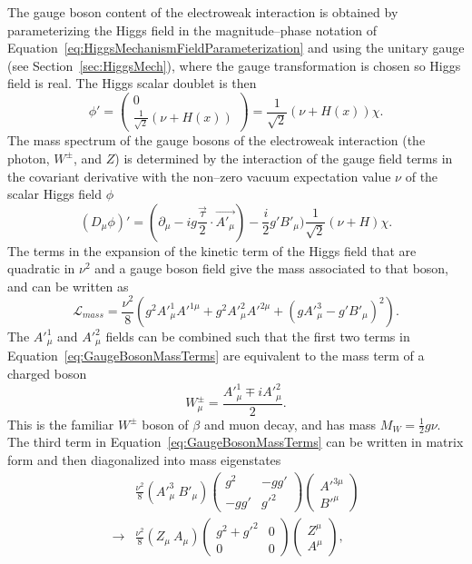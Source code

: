 The gauge boson content of the electroweak interaction is obtained by
parameterizing the Higgs field in the magnitude--phase notation of
Equation~\ref{eq:HiggsMechanismFieldParameterization} and using the unitary
gauge (see Section~\ref{sec:HiggsMech}), where the gauge transformation is
chosen so Higgs field is real.  The Higgs scalar doublet is then 
\begin{equation}
  \phi' =  \left(\begin{array}{c} 0 \\ \frac{1}{\sqrt 2}(\nu +
    H(x))\end{array}\right) = 
    \frac{1}{\sqrt 2}(\nu + H(x))\chi.
    \label{eq:HiggsFieldParameterization}
\end{equation}
The mass spectrum of the gauge bosons of the electroweak interaction (the
photon, $W^\pm$, and $Z$) is determined by the interaction of the gauge field
terms in the covariant derivative with the non--zero vacuum expectation value
$\nu$ of the scalar Higgs field $\phi$
\begin{equation}
  (D_\mu\phi)' = (\partial_\mu - i g \frac{\vec \tau}{2}\cdot \vec{A'_\mu}) -
  \frac{i}{2}g'B'_\mu)\frac{1}{\sqrt 2}(\nu + H)\chi.
  \nonumber
\end{equation}
The terms in the expansion of the kinetic term of the Higgs field that are
quadratic in $\nu^2$ and a gauge boson field give the mass associated to that
boson, and can be written as
\begin{equation}
  \mathcal{L}_{mass} = \frac{\nu^2}{8}(
  g^2 A'^1_\mu A'^{1\mu} + g^2 A'^2_\mu A'^{2\mu} + (g A'^3_\mu - g'B'_\mu)^2).
  \label{eq:GaugeBosonMassTerms}
\end{equation}
The $A'^1_\mu$ and $A'^2_\mu$ fields can be combined such that the first two
terms in Equation~\ref{eq:GaugeBosonMassTerms} are equivalent to the mass term
of a charged boson
\begin{equation}
  W^\pm_\mu = \frac{A'^{1}_\mu \mp iA'^2_\mu}{2}.
\end{equation}
This is the familiar $W^\pm$ boson of $\beta$ and muon decay, and has mass $M_W
= \frac{1}{2}g\nu$.  The third term in Equation~\ref{eq:GaugeBosonMassTerms} can
be written in matrix form and then diagonalized into mass eigenstates
\begin{eqnarray}
  &\frac{\nu^2}{8}(A'^3_\mu~B'_\mu) 
  \left(
  \begin{array}{cc}
    g^2 & -gg' \\
    -gg' & g'^2 
  \end{array}
  \right)
  \left(
  \begin{array}{c}
    A'^{3\mu} \\
    B'^\mu
  \end{array}
  \right) \\
  \to & 
  \frac{\nu^2}{8}(Z_\mu~A_\mu) 
  \left(
  \begin{array}{cc}
    g^2 + g'^2  & 0\\
    0 & 0 
  \end{array}
  \right)
  \left(
  \begin{array}{c}
    Z^\mu \\
    A^\mu
  \end{array}
  \right), \nonumber 
\end{eqnarray}
